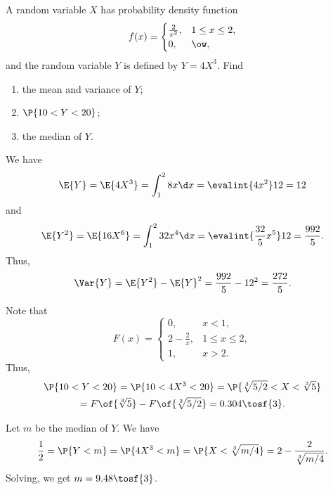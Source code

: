 \begin{problem}
    A random variable $X$ has probability density function \[f(x) = \begin{cases}
        \frac2{x^2}, & 1 \leq x \leq 2,\\
        0, & \ow,
    \end{cases}\] and the random variable $Y$ is defined by $Y=4X^{3}$. Find
    \begin{enumerate}
        \item the mean and variance of $Y$;
        \item $\P{10 < Y < 20}$;
        \item the median of $Y$.
    \end{enumerate}
\end{problem}
\begin{solution}
    \begin{ppart}
        We have \[\E{Y} = \E{4X^3} = \int_1^2 8x \d x = \evalint{4x^2}12 = 12\] and \[\E{Y^2} = \E{16X^6} = \int_1^2 32x^4 \d x = \evalint{\frac{32}{5} x^5}12 = \frac{992}{5}.\] Thus, \[\Var{Y} = \E{Y^2} - \E{Y}^2 = \frac{992}{5} - 12^2 = \frac{272}{5}.\]
    \end{ppart}
    \begin{ppart}
        Note that \[F(x) = \begin{cases}
            0, & x < 1,\\
            2-\frac{2}{x}, & 1 \leq x \leq 2,\\
            1, & x > 2.
        \end{cases}\] Thus,
        \begin{gather*}
            \P{10 < Y < 20} = \P{10 < 4X^3 < 20} = \P{\sqrt[3]{5/2} < X < \sqrt[3]{5}}\\
            = F\of{\sqrt[3]{5}} - F\of{\sqrt[3]{5/2}} = 0.304 \tosf{3}.
        \end{gather*}
    \end{ppart}
    \begin{ppart}
        Let $m$ be the median of $Y$. We have \[\frac12 = \P{Y < m} = \P{4X^3 < m} = \P{X < \sqrt[3]{m/4}} = 2 - \frac2{\sqrt[3]{m/4}}.\] Solving, we get $m = 9.48 \tosf{3}$.
    \end{ppart}
\end{solution}